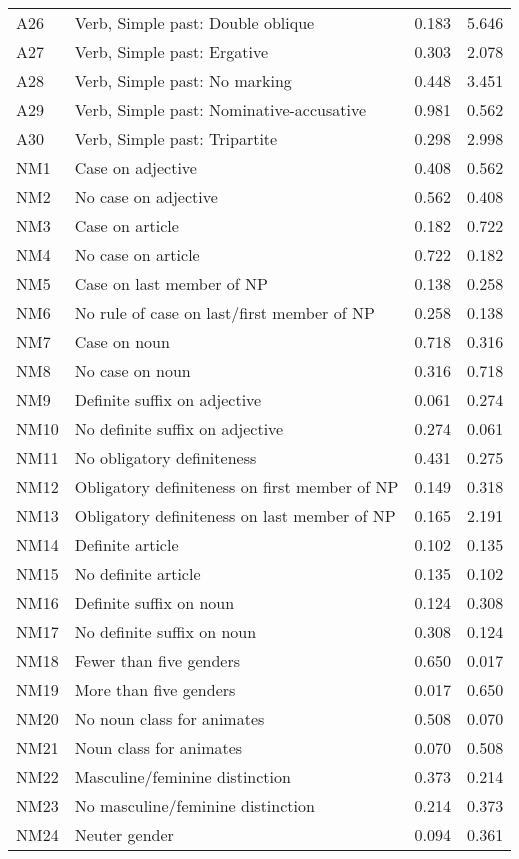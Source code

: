 \begin{longtable}{llll}
A26 & Verb, Simple past: Double oblique & 0.183 & 5.646\\
A27 & Verb, Simple past: Ergative & 0.303 & 2.078\\
A28 & Verb, Simple past: No marking & 0.448 & 3.451\\
A29 & Verb, Simple past: Nominative-accusative & 0.981 & 0.562\\
A30 & Verb, Simple past: Tripartite & 0.298 & 2.998\\
NM1 & Case on adjective & 0.408 & 0.562\\
NM2 & No case on adjective & 0.562 & 0.408\\
NM3 & Case on article & 0.182 & 0.722\\
NM4 & No case on article & 0.722 & 0.182\\
NM5 & Case on last member of NP & 0.138 & 0.258\\
NM6 & No rule of case on last/first member of NP & 0.258 & 0.138\\
NM7 & Case on noun & 0.718 & 0.316\\
NM8 & No case on noun & 0.316 & 0.718\\
NM9 & Definite suffix on adjective & 0.061 & 0.274\\
NM10 & No definite suffix on adjective & 0.274 & 0.061\\
NM11 & No obligatory definiteness & 0.431 & 0.275\\
NM12 & Obligatory definiteness on first member of NP & 0.149 & 0.318\\
NM13 & Obligatory definiteness on last member of NP & 0.165 & 2.191\\
NM14 & Definite article & 0.102 & 0.135\\
NM15 & No definite article & 0.135 & 0.102\\
NM16 & Definite suffix on noun & 0.124 & 0.308\\
NM17 & No definite suffix on noun & 0.308 & 0.124\\
NM18 & Fewer than five genders & 0.650 & 0.017\\
NM19 & More than five genders & 0.017 & 0.650\\
NM20 & No noun class for animates & 0.508 & 0.070\\
NM21 & Noun class for animates & 0.070 & 0.508\\
NM22 & Masculine/feminine distinction & 0.373 & 0.214\\
NM23 & No masculine/feminine distinction & 0.214 & 0.373\\
NM24 & Neuter gender & 0.094 & 0.361\\

\end{longtable}
